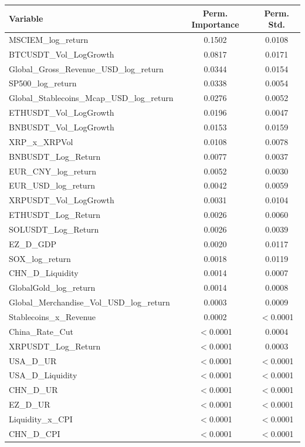 \begin{tabular}{lcc}
  \toprule
  \textbf{Variable} & \textbf{Perm. Importance} & \textbf{Perm. Std.} \\ 
  \midrule
  MSCIEM\_log\_return & 0.1502 & 0.0108 \\ 
  BTCUSDT\_Vol\_LogGrowth & 0.0817 & 0.0171 \\ 
  Global\_Gross\_Revenue\_USD\_log\_return & 0.0344 & 0.0154 \\ 
  SP500\_log\_return & 0.0338 & 0.0054 \\ 
  Global\_Stablecoins\_Mcap\_USD\_log\_return & 0.0276 & 0.0052 \\ 
  ETHUSDT\_Vol\_LogGrowth & 0.0196 & 0.0047 \\ 
  BNBUSDT\_Vol\_LogGrowth & 0.0153 & 0.0159 \\ 
  XRP\_x\_XRPVol & 0.0108 & 0.0078 \\ 
  BNBUSDT\_Log\_Return & 0.0077 & 0.0037 \\ 
  EUR\_CNY\_log\_return & 0.0052 & 0.0030 \\ 
  EUR\_USD\_log\_return & 0.0042 & 0.0059 \\ 
  XRPUSDT\_Vol\_LogGrowth & 0.0031 & 0.0104 \\ 
  ETHUSDT\_Log\_Return & 0.0026 & 0.0060 \\ 
  SOLUSDT\_Log\_Return & 0.0026 & 0.0039 \\ 
  EZ\_D\_GDP & 0.0020 & 0.0117 \\ 
  SOX\_log\_return & 0.0018 & 0.0119 \\ 
  CHN\_D\_Liquidity & 0.0014 & 0.0007 \\ 
  GlobalGold\_log\_return & 0.0014 & 0.0008 \\ 
  Global\_Merchandise\_Vol\_USD\_log\_return & 0.0003 & 0.0009 \\ 
  Stablecoins\_x\_Revenue & 0.0002 & $<$0.0001 \\ 
  China\_Rate\_Cut & $<$0.0001 & 0.0004 \\ 
  XRPUSDT\_Log\_Return & $<$0.0001 & 0.0003 \\ 
  USA\_D\_UR & $<$0.0001 & $<$0.0001 \\ 
  USA\_D\_Liquidity & $<$0.0001 & $<$0.0001 \\ 
  CHN\_D\_UR & $<$0.0001 & $<$0.0001 \\ 
  EZ\_D\_UR & $<$0.0001 & $<$0.0001 \\ 
  Liquidity\_x\_CPI & $<$0.0001 & $<$0.0001 \\ 
  CHN\_D\_CPI & $<$0.0001 & $<$0.0001 \\ 

\end{tabular}
